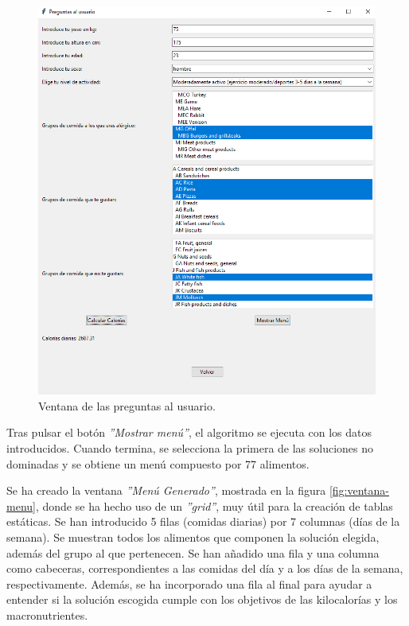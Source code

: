 \begin{figure}[H]
    \centering
    \includegraphics[width=1\textwidth]{figures/ventana-preguntasusuario.png}
    \caption{Ventana de las preguntas al usuario.}
    \label{fig:ventana-usuario}
\end{figure}
\newpage
Tras pulsar el botón \textit{''Mostrar menú''}, el algoritmo se ejecuta con los datos introducidos. Cuando termina, se selecciona la primera de las soluciones no dominadas y se obtiene un menú compuesto por 77 alimentos.

Se ha creado la ventana \textit{''Menú Generado''}, mostrada en la figura \ref{fig:ventana-menu}, donde se ha hecho uso de un \textit{''grid''}, muy útil para la creación de tablas estáticas. Se han introducido 5 filas (comidas diarias) por 7 columnas (días de la semana). Se muestran todos los alimentos que componen la solución elegida, además del grupo al que pertenecen. Se han añadido una fila y una columna como cabeceras, correspondientes a las comidas del día y a los días de la semana, respectivamente. Además, se ha incorporado una fila al final para ayudar a entender si la solución escogida cumple con los objetivos de las kilocalorías y los macronutrientes.

